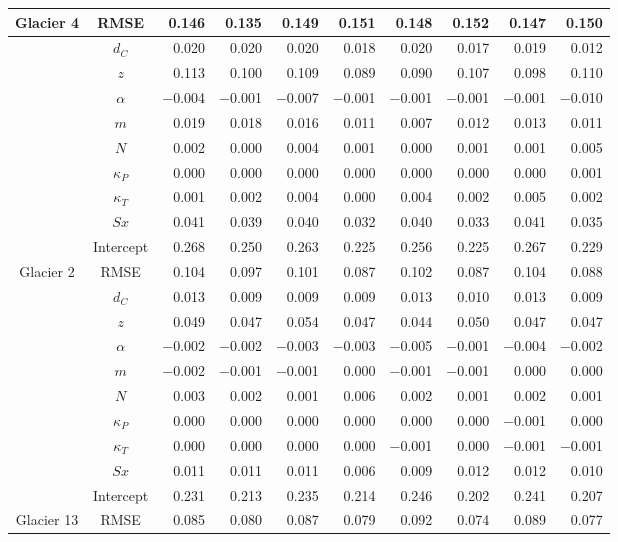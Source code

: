 \documentclass[12pt]{article}
\begin{document}
\begin{table}
\begin{tabular}{ccrrrrrrrr}
\multirow{-10}{*}{Glacier 4} & RMSE & 0.146 & 0.135 & 0.149 & 0.151 & 0.148 & 0.152 & 0.147 & 0.150 \\ \hline
 & $d_C$ & 0.020 & 0.020 & 0.020 & 0.018 & 0.020 & 0.017 & 0.019 & 0.012 \\
 & $z$ & 0.113 & 0.100 & 0.109 & 0.089 & 0.090 & 0.107 & 0.098 & 0.110 \\
 & $\alpha$ & $-$0.004 & $-$0.001 & $-$0.007 & $-$0.001 & $-$0.001 & $-$0.001 & $-$0.001 & $-$0.010 \\
 & $m$ & 0.019 & 0.018 & 0.016 & 0.011 & 0.007 & 0.012 & 0.013 & 0.011 \\
 & $N$ & 0.002 & 0.000 & 0.004 & 0.001 & 0.000 & 0.001 & 0.001 & 0.005 \\
 & $\kappa_P$ & 0.000 & 0.000 & 0.000 & 0.000 & 0.000 & 0.000 & 0.000 & 0.001 \\
 & $\kappa_T$ & 0.001 & 0.002 & 0.004 & 0.000 & 0.004 & 0.002 & 0.005 & 0.002 \\
 & $Sx$ & 0.041 & 0.039 & 0.040 & 0.032 & 0.040 & 0.033 & 0.041 & 0.035 \\
 & Intercept & 0.268 & 0.250 & 0.263 & 0.225 & 0.256 & 0.225 & 0.267 & 0.229 \\
\multirow{-10}{*}{Glacier 2} & RMSE & 0.104 & 0.097 & 0.101 & 0.087 & 0.102 & 0.087 & 0.104 & 0.088 \\ \hline
 
 & $d_C$ & 0.013 & 0.009 & 0.009 & 0.009 & 0.013 & 0.010 & 0.013 & 0.009 \\
 
 & $z$ & 0.049 & 0.047 & 0.054 & 0.047 & 0.044 & 0.050 & 0.047 & 0.047 \\
 
 & $\alpha$ & $-$0.002 & $-$0.002 & $-$0.003 & $-$0.003 & $-$0.005 & $-$0.001 & $-$0.004 & $-$0.002 \\
 
 & $m$ & $-$0.002 & $-$0.001 & $-$0.001 & 0.000 & $-$0.001 & $-$0.001 & 0.000 & 0.000 \\
 
 & $N$ & 0.003 & 0.002 & 0.001 & 0.006 & 0.002 & 0.001 & 0.002 & 0.001 \\
 
 & $\kappa_P$ & 0.000 & 0.000 & 0.000 & 0.000 & 0.000 & 0.000 & $-$0.001 & 0.000 \\
 
 & $\kappa_T$ & 0.000 & 0.000 & 0.000 & 0.000 & $-$0.001 & 0.000 & $-$0.001 & $-$0.001 \\
 
 & $Sx$ & 0.011 & 0.011 & 0.011 & 0.006 & 0.009 & 0.012 & 0.012 & 0.010 \\
 
 & Intercept & 0.231 & 0.213 & 0.235 & 0.214 & 0.246 & 0.202 & 0.241 & 0.207 \\
 
\multirow{-10}{*}{Glacier 13} & RMSE & 0.085 & 0.080 & 0.087 & 0.079 & 0.092 & 0.074 & 0.089 & 0.077

\end{tabular}
\end{table}
\end{document}
